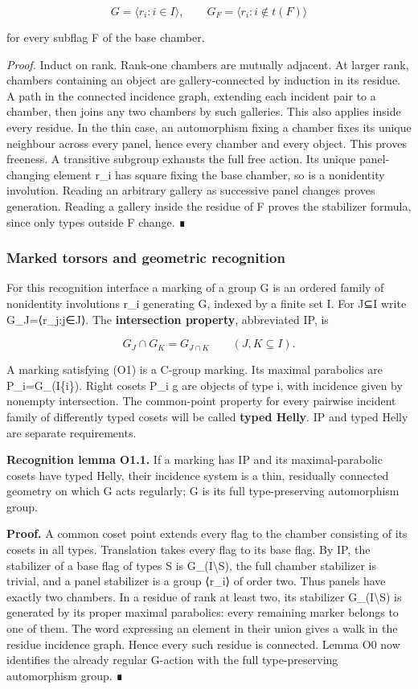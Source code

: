 \documentclass[
  10pt,
  letterpaper,
]{article}
\newcounter{none} %
\begin{document}
\[
 G=\langle r_i:i\in I\rangle,
 \qquad G_F=\langle r_i:i\notin t(F)\rangle
 \tag{O0}
\]

for every subflag F of the base chamber.

\emph{Proof.} Induct on rank. Rank-one chambers are mutually adjacent.
At larger rank, chambers containing an object are gallery-connected by
induction in its residue. A path in the connected incidence graph,
extending each incident pair to a chamber, then joins any two chambers
by such galleries. This also applies inside every residue. In the thin
case, an automorphism fixing a chamber fixes its unique neighbour across
every panel, hence every chamber and every object. This proves freeness.
A transitive subgroup exhausts the full free action. Its unique
panel-changing element r\_i has square fixing the base chamber, so is a
nonidentity involution. Reading an arbitrary gallery as successive panel
changes proves generation. Reading a gallery inside the residue of F
proves the stabilizer formula, since only types outside F change. ∎

\subsubsection{Marked torsors and geometric
recognition}\label{marked-torsors-and-geometric-recognition}

For this recognition interface a marking of a group G is an ordered
family of nonidentity involutions r\_i generating G, indexed by a finite
set I. For J⊆I write G\_J=⟨r\_j:j∈J⟩. The \textbf{intersection
property}, abbreviated IP, is

\[
G_J\cap G_K=G_{J\cap K}\qquad(J,K\subseteq I).
\tag{O1}
\]

A marking satisfying (O1) is a C-group marking. Its maximal parabolics
are P\_i=G\_(I\{i\}). Right cosets P\_i g are objects of type i, with
incidence given by nonempty intersection. The common-point property for
every pairwise incident family of differently typed cosets will be
called \textbf{typed Helly}. IP and typed Helly are separate
requirements.

\textbf{Recognition lemma O1.1.} If a marking has IP and its
maximal-parabolic cosets have typed Helly, their incidence system is a
thin, residually connected geometry on which G acts regularly; G is its
full type-preserving automorphism group.

\textbf{Proof.} A common coset point extends every flag to the chamber
consisting of its cosets in all types. Translation takes every flag to
its base flag. By IP, the stabilizer of a base flag of types S is
G\_(I\textbackslash S), the full chamber stabilizer is trivial, and a
panel stabilizer is a group ⟨r\_i⟩ of order two. Thus panels have
exactly two chambers. In a residue of rank at least two, its stabilizer
G\_(I\textbackslash S) is generated by its proper maximal parabolics:
every remaining marker belongs to one of them. The word expressing an
element in their union gives a walk in the residue incidence graph.
Hence every such residue is connected. Lemma O0 now identifies the
already regular G-action with the full type-preserving automorphism
group. ∎
\end{document}
